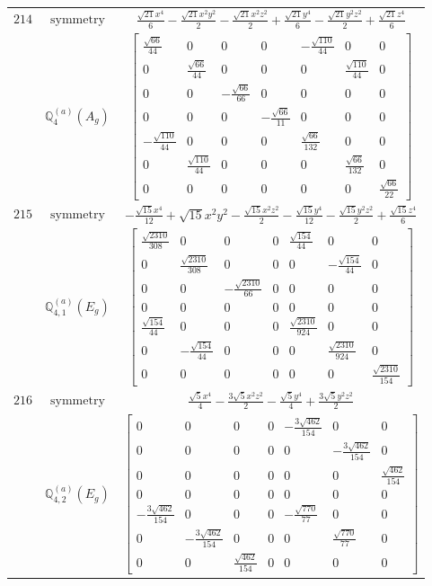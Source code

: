\documentclass[fleqn,8pt,landscape]{jsarticle}
\begin{document}
\begin{longtable}{ccc}
$ 214 $ & $ \text{symmetry} $ & $ \frac{\sqrt{21} x^{4}}{6} - \frac{\sqrt{21} x^{2} y^{2}}{2} - \frac{\sqrt{21} x^{2} z^{2}}{2} + \frac{\sqrt{21} y^{4}}{6} - \frac{\sqrt{21} y^{2} z^{2}}{2} + \frac{\sqrt{21} z^{4}}{6} $ \\
$  $ & $ \mathbb{Q}_{4}^{(a)}(A_{g}) $ & $ \begin{bmatrix} \frac{\sqrt{66}}{44} & 0 & 0 & 0 & - \frac{\sqrt{110}}{44} & 0 & 0 \\ 0 & \frac{\sqrt{66}}{44} & 0 & 0 & 0 & \frac{\sqrt{110}}{44} & 0 \\ 0 & 0 & - \frac{\sqrt{66}}{66} & 0 & 0 & 0 & 0 \\ 0 & 0 & 0 & - \frac{\sqrt{66}}{11} & 0 & 0 & 0 \\ - \frac{\sqrt{110}}{44} & 0 & 0 & 0 & \frac{\sqrt{66}}{132} & 0 & 0 \\ 0 & \frac{\sqrt{110}}{44} & 0 & 0 & 0 & \frac{\sqrt{66}}{132} & 0 \\ 0 & 0 & 0 & 0 & 0 & 0 & \frac{\sqrt{66}}{22} \end{bmatrix} $ \\ \hline
$ 215 $ & $ \text{symmetry} $ & $ - \frac{\sqrt{15} x^{4}}{12} + \sqrt{15} x^{2} y^{2} - \frac{\sqrt{15} x^{2} z^{2}}{2} - \frac{\sqrt{15} y^{4}}{12} - \frac{\sqrt{15} y^{2} z^{2}}{2} + \frac{\sqrt{15} z^{4}}{6} $ \\
$  $ & $ \mathbb{Q}_{4,1}^{(a)}(E_{g}) $ & $ \begin{bmatrix} \frac{\sqrt{2310}}{308} & 0 & 0 & 0 & \frac{\sqrt{154}}{44} & 0 & 0 \\ 0 & \frac{\sqrt{2310}}{308} & 0 & 0 & 0 & - \frac{\sqrt{154}}{44} & 0 \\ 0 & 0 & - \frac{\sqrt{2310}}{66} & 0 & 0 & 0 & 0 \\ 0 & 0 & 0 & 0 & 0 & 0 & 0 \\ \frac{\sqrt{154}}{44} & 0 & 0 & 0 & \frac{\sqrt{2310}}{924} & 0 & 0 \\ 0 & - \frac{\sqrt{154}}{44} & 0 & 0 & 0 & \frac{\sqrt{2310}}{924} & 0 \\ 0 & 0 & 0 & 0 & 0 & 0 & \frac{\sqrt{2310}}{154} \end{bmatrix} $ \\ \hline
$ 216 $ & $ \text{symmetry} $ & $ \frac{\sqrt{5} x^{4}}{4} - \frac{3 \sqrt{5} x^{2} z^{2}}{2} - \frac{\sqrt{5} y^{4}}{4} + \frac{3 \sqrt{5} y^{2} z^{2}}{2} $ \\
$  $ & $ \mathbb{Q}_{4,2}^{(a)}(E_{g}) $ & $ \begin{bmatrix} 0 & 0 & 0 & 0 & - \frac{3 \sqrt{462}}{154} & 0 & 0 \\ 0 & 0 & 0 & 0 & 0 & - \frac{3 \sqrt{462}}{154} & 0 \\ 0 & 0 & 0 & 0 & 0 & 0 & \frac{\sqrt{462}}{154} \\ 0 & 0 & 0 & 0 & 0 & 0 & 0 \\ - \frac{3 \sqrt{462}}{154} & 0 & 0 & 0 & - \frac{\sqrt{770}}{77} & 0 & 0 \\ 0 & - \frac{3 \sqrt{462}}{154} & 0 & 0 & 0 & \frac{\sqrt{770}}{77} & 0 \\ 0 & 0 & \frac{\sqrt{462}}{154} & 0 & 0 & 0 & 0 \end{bmatrix} $ \\ \hline

\end{longtable}
\end{document}
